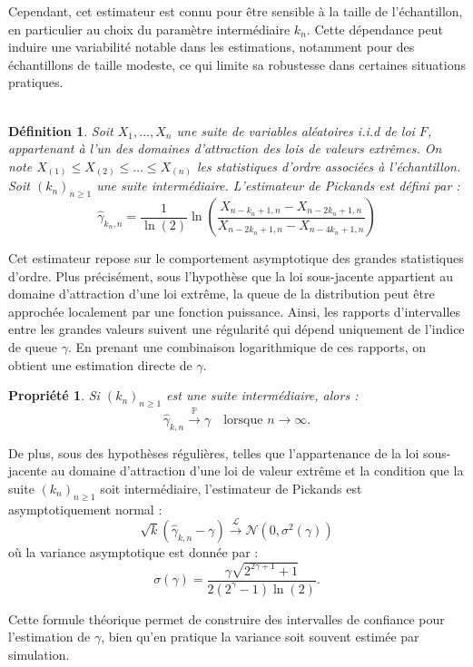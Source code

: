 \documentclass{article}
\theoremstyle{plain}
\newtheorem{definition}{Définition}[section]
\theoremstyle{definition}
\theoremstyle{plain}
\newtheorem{property}{Propriété}
\begin{document}
Cependant, cet estimateur est connu pour être sensible à la taille de l’échantillon, en particulier au choix du paramètre intermédiaire \(k_n\). Cette dépendance peut induire une variabilité notable dans les estimations, notamment pour des échantillons de taille modeste, ce qui limite sa robustesse dans certaines situations pratiques.
\\
\\
\medskip
\begin{definition}
Soit \(X_1, \dots, X_n\) une suite de variables aléatoires i.i.d de loi \(F\), appartenant à l’un des domaines d’attraction des lois de valeurs extrêmes. On note \(X_{(1)} \leq X_{(2)} \leq \dots \leq X_{(n)}\) les statistiques d’ordre associées à l’échantillon. Soit \((k_n)_{n \geq 1}\) une suite intermédiaire.
L’estimateur de Pickands est défini par :
\[
\hat{\gamma}_{k_n,n} = \frac{1}{\ln(2)} \ln\left( \frac{X_{n-k_n+1,n} - X_{n-2k_n+1,n}}{X_{n-2k_n+1,n} - X_{n-4k_n+1,n}} \right)
\]
\end{definition}
\medskip
\noindent Cet estimateur repose sur le comportement asymptotique des grandes statistiques d’ordre. Plus précisément, sous l’hypothèse que la loi sous-jacente appartient au domaine d’attraction d’une loi extrême, la queue de la distribution peut être approchée localement par une fonction puissance. Ainsi, les rapports d’intervalles entre les grandes valeurs suivent une régularité qui dépend uniquement de l’indice de queue \(\gamma\). En prenant une combinaison logarithmique de ces rapports, on obtient une estimation directe de \(\gamma\).
\medskip
\begin{property}
Si \((k_n)_{n \geq 1}\) est une suite intermédiaire, alors :
\[
\hat{\gamma}_{k,n} \xrightarrow{\mathbb{P}} \gamma
\quad \text{lorsque } n \to \infty.
\]
\end{property}
\noindent De plus, sous des hypothèses régulières, telles que l’appartenance de la loi sous-jacente au domaine d’attraction d’une loi de valeur extrême et la condition que la suite $(k_n)_{n \geq 1}$ soit intermédiaire, l’estimateur de Pickands est asymptotiquement normal :
\[
\sqrt{k} \left( \hat{\gamma}_{k,n} - \gamma \right) \xrightarrow{\mathcal{L}} \mathcal{N}(0, \sigma^2(\gamma))
\]
où la variance asymptotique est donnée par :
\[
\sigma(\gamma) = \frac{\gamma \sqrt{2^{2\gamma + 1} + 1}}{2(2^{\gamma} - 1)\ln(2)}.
\]

\medskip
\noindent Cette formule théorique permet de construire des intervalles de confiance pour l’estimation de \(\gamma\), bien qu’en pratique la variance soit souvent estimée par simulation.
\end{document}
